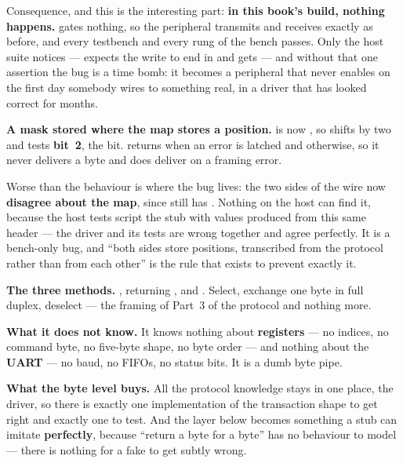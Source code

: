 Consequence, and this is the interesting part: \textbf{in this book's build, nothing happens.}
 gates nothing, so the peripheral transmits and receives exactly as before, and every
testbench and every rung of the bench passes. Only the host suite notices ---
 expects the  write to end in  and
gets  --- and without that one assertion the bug is a time bomb: it becomes a peripheral
that never enables on the first day somebody wires  to something real, in a driver
that has looked correct for months. 

\textbf{A mask stored where the map stores a position.}  is now , so
 shifts by two and tests \textbf{bit~2}, the  bit.
 returns  when an error is latched and  otherwise, so it never
delivers a byte and does deliver on a framing error.

Worse than the behaviour is where the bug lives: the two sides of the wire now \textbf{disagree
about the map}, since  still has . Nothing on the host can
find it, because the host tests script the stub with values produced from this same header --- the
driver and its tests are wrong together and agree perfectly. It is a bench-only bug, and ``both
sides store positions, transcribed from the protocol rather than from each other'' is the rule that
exists to prevent exactly it. 

\textbf{The three methods.} ,  returning , and
. Select, exchange one byte in full duplex, deselect --- the framing of Part~3 of the
protocol and nothing more. 

\textbf{What it does not know.} It knows nothing about \textbf{registers} --- no indices, no command
byte, no five-byte shape, no byte order --- and nothing about the \textbf{UART} --- no baud, no FIFOs,
no status bits. It is a dumb byte pipe.

\textbf{What the byte level buys.} All the protocol knowledge stays in one place, the driver, so
there is exactly one implementation of the transaction shape to get right and exactly one to test.
And the layer below becomes something a stub can imitate \textbf{perfectly}, because ``return a byte
for a byte'' has no behaviour to model --- there is nothing for a fake to get subtly wrong.

